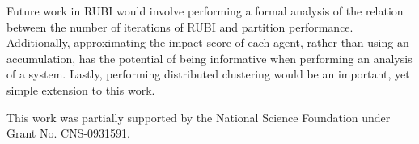 \documentclass[letterpaper]{article}
\begin{document}
Future work in RUBI would involve performing a formal analysis of the relation between the number of iterations of RUBI and partition performance. Additionally, approximating the impact score of each agent, rather than using an accumulation, has the potential of being informative when performing an analysis of a system. Lastly, performing distributed clustering would be an important, yet simple extension to this work.

This work was partially supported by the National Science Foundation under Grant No. CNS-0931591.
\label{sec:CONCLUSION}




\end{document}
